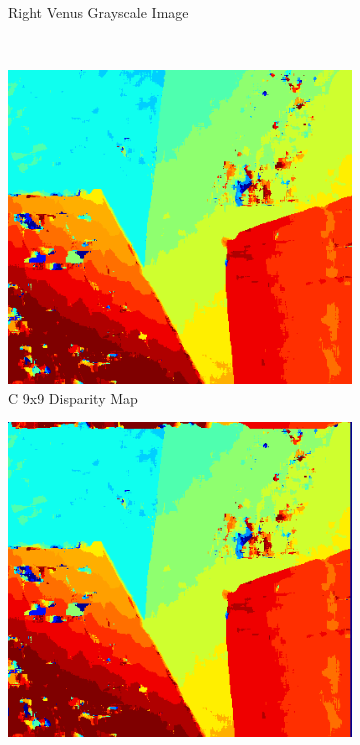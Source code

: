 \begin{figure}
\begin{center}
\begin{subfigure}{0.45\textwidth}
		\caption{Right Venus Grayscale Image}
		\label{fig:venusR}
	\end{subfigure}
	\\
	\begin{subfigure}{0.45\textwidth}
		\includegraphics[width=\textwidth]{figures/venus_c_9x9.png}
		\caption{C 9x9 Disparity Map}
		\label{fig:venusC9x9}
	\end{subfigure}
	\begin{subfigure}{0.45\textwidth}
		\includegraphics[width=\textwidth]{figures/venus_9x9_fpga.png}

\end{subfigure}
\end{center}
\end{figure}
